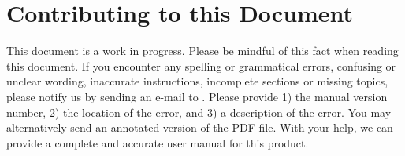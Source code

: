 \chapter*{Contributing to this Document}

This document is a work in progress.  Please be mindful of this fact when reading this document.  If you encounter any spelling or grammatical errors, confusing or unclear wording, inaccurate instructions, incomplete sections or missing topics, please notify us by sending an e-mail to .  Please provide 1) the manual version number, 2) the location of the error, and 3) a description of the error.  You may alternatively send an annotated version of the PDF file.  With your help, we can provide a complete and accurate user manual for this product.
